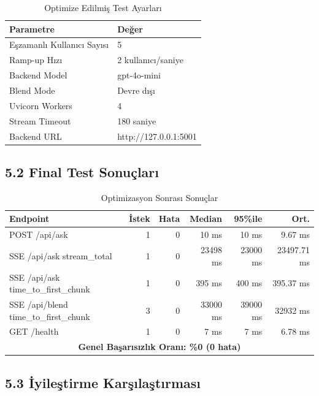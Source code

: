 \documentclass[12pt,a4paper]{report}
\begin{document}
\begin{table}[h]
\centering
\caption{Optimize Edilmiş Test Ayarları}
\begin{tabular}{l|l}
\toprule
\textbf{Parametre} & \textbf{Değer} \\
\midrule
Eşzamanlı Kullanıcı Sayısı & 5 \\
Ramp-up Hızı & 2 kullanıcı/saniye \\
Backend Model & gpt-4o-mini \\
Blend Mode & Devre dışı \\
Uvicorn Workers & 4 \\
Stream Timeout & 180 saniye \\
Backend URL & http://127.0.0.1:5001 \\
\bottomrule
\end{tabular}
\end{table}

\subsection{5.2 Final Test Sonuçları}

\begin{table}[h]
\centering
\caption{Optimizasyon Sonrası Sonuçlar}
\begin{tabular}{l|r|r|r|r|r}
\toprule
\textbf{Endpoint} & \textbf{İstek} & \textbf{Hata} & \textbf{Median} & \textbf{95\%ile} & \textbf{Ort.} \\
\midrule
POST /api/ask & 1 & 0 & 10 ms & 10 ms & 9.67 ms \\
SSE /api/ask stream\_total & 1 & 0 & 23498 ms & 23000 ms & 23497.71 ms \\
SSE /api/ask time\_to\_first\_chunk & 1 & 0 & 395 ms & 400 ms & 395.37 ms \\
SSE /api/blend time\_to\_first\_chunk & 3 & 0 & 33000 ms & 39000 ms & 32932 ms \\
GET /health & 1 & 0 & 7 ms & 7 ms & 6.78 ms \\
\midrule
\multicolumn{6}{c}{\textbf{Genel Başarısızlık Oranı: \%0 (0 hata)}} \\
\bottomrule
\end{tabular}
\end{table}

\subsection{5.3 İyileştirme Karşılaştırması}
\end{document}
